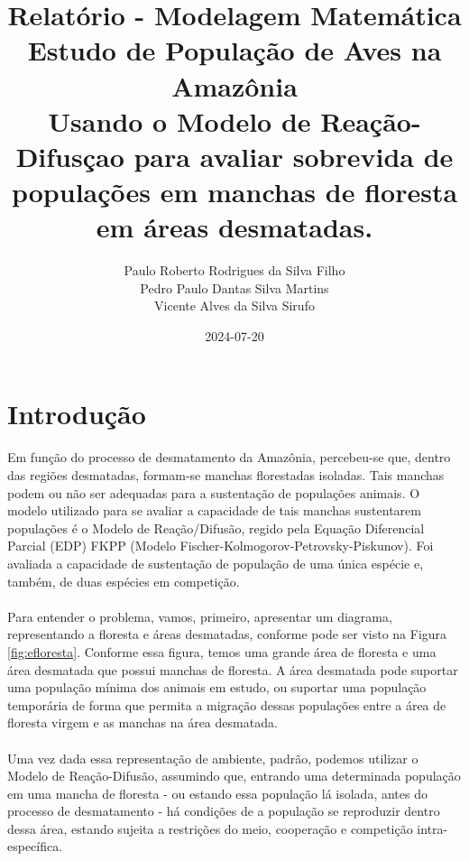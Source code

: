 \documentclass{article}
\title{
	Relatório - Modelagem Matemática\\
	Estudo de População de Aves na Amazônia \\
	\large Usando o Modelo de Reação-Difusçao para avaliar sobrevida de populações em manchas de floresta em áreas desmatadas.
}
\date{2024-07-20}
\author{Paulo Roberto Rodrigues da Silva Filho\\Pedro Paulo Dantas Silva Martins\\Vicente Alves da Silva Sirufo}
\begin{document}
	\renewcommand{\figurename}{Figura}
	\renewcommand{\tablename}{Tabela}
	\renewcommand{\cellalign}{tl}
	\renewcommand{\theadalign}{tl}
	
	\graphicspath{ {./imagens/} }
	\maketitle
	\tableofcontents
	
	\section{Introdução}
	
	\paragraph{}
	Em função do processo de desmatamento da Amazônia, percebeu-se que, dentro das regiões desmatadas, formam-se manchas florestadas isoladas. Tais manchas podem ou não ser adequadas para a sustentação de populações animais. O modelo utilizado para se avaliar a capacidade de tais manchas sustentarem populações é o Modelo de Reação/Difusão, regido pela Equação Diferencial Parcial (EDP) FKPP (Modelo Fischer-Kolmogorov-Petrovsky-Piskunov). Foi avaliada a capacidade de sustentação de população de uma única espécie e, também, de duas espécies em competição.
	
	\paragraph{}
	Para entender o problema, vamos, primeiro, apresentar um diagrama, representando a floresta e áreas desmatadas, conforme pode ser visto na Figura \ref{fig:efloresta}. Conforme essa figura, temos uma grande área de floresta e uma área desmatada que possui manchas de floresta. A área desmatada pode suportar uma população mínima dos animais em estudo, ou suportar uma população temporária de forma que permita a migração dessas populações entre a área de floresta virgem e as manchas na área desmatada.
	
	\paragraph{}
	Uma vez dada essa representação de ambiente, padrão, podemos utilizar o Modelo de Reação-Difusão, assumindo que, entrando uma determinada população em uma mancha de floresta - ou estando essa população lá isolada, antes do processo de desmatamento - há condições de a população se reproduzir dentro dessa área, estando sujeita a restrições do meio, cooperação e competição intra-específica.
	
\end{document}
